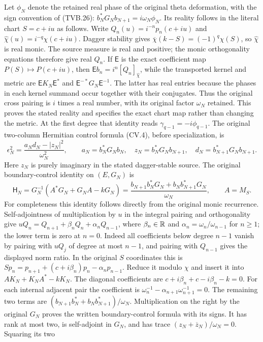 Let $\phi_N$ denote the retained real phase of the original
theta deformation, with the sign convention of (TVB.26):
$b_N^*G_Nb_{N+1}=i\omega_N\phi_N$.
Its reality follows in the literal chart $S=c+iu$ as follows.
Write $Q_n(u)=i^{-n}p_n(c+iu)$ and
$\widehat\chi(u)=i^{-q}\chi(c+iu)$. Dagger stability gives
$\overline\chi(k-S)=(-1)^q\chi(S)$, so $\widehat\chi$
is real monic. The source measure is real and positive; the
monic orthogonality equations therefore give real $Q_n$.
If $\mathsf E$ is the exact coefficient map
$P(S)\mapsto P(c+iu)$, then
$\mathsf E b_n=i^n[Q_n]_{\widehat\chi}$, while the transported
kernel and metric are $\mathsf E K_N\mathsf E^*$ and
$\mathsf E^{-*}G_N\mathsf E^{-1}$.
The latter has real entries because the phases in each kernel
summand occur together with their conjugates. Thus the original
cross pairing is $i$ times a real number, with its original
factor $\omega_N$ retained. This proves the stated reality
and specifies the exact chart map rather than changing the metric.
At the first degree that identity reads
$\gamma_{q-1}=-i\phi_{q-1}$. The original two-column Hermitian
control formula (CV.4), before specialization, is
\[
 \epsilon_N^2=
 \frac{a_N d_N-|z_N|^2}{\omega_N^2},\qquad
 a_N=b_N^*G_Nb_N,\quad z_N=b_N^*G_Nb_{N+1},\quad
 d_N=b_{N+1}^*G_Nb_{N+1}.
 \tag{CJ.5}
\]
Here $z_N$ is purely imaginary in the stated dagger-stable
source. The original boundary-control identity on $(E,G_N)$ is
\[
 \mathsf H_N=G_N^{-1}(A^*G_N+G_NA-kG_N)
 =\frac{b_{N+1}b_N^*G_N+b_Nb_{N+1}^*G_N}{\omega_N},
 \qquad A=M_S.
\]
For completeness this identity follows directly from the original
monic recurrence. Self-adjointness of multiplication by $u$ in
the integral pairing and orthogonality give
$uQ_n=Q_{n+1}+\beta_nQ_n+\alpha_nQ_{n-1}$, where
$\beta_n\in\mathbb{R}$ and $\alpha_n=\omega_n/\omega_{n-1}$ for
$n\ge1$; the lower term is zero at $n=0$.
Indeed all coefficients below degree $n-1$ vanish by pairing
with $uQ_j$ of degree at most $n-1$, and pairing with
$Q_{n-1}$ gives the displayed norm ratio. In the original
$S$ coordinates this is
$Sp_n=p_{n+1}+(c+i\beta_n)p_n-\alpha_np_{n-1}$.
Reduce it modulo $\chi$ and insert it into
$AK_N+K_NA^*-kK_N$. The diagonal coefficients are
$c+i\beta_n+c-i\beta_n-k=0$. For each internal adjacent
pair the coefficient is
$\omega_n^{-1}-\alpha_{n+1}\omega_{n+1}^{-1}=0$.
The remaining two terms are
$(b_{N+1}b_N^*+b_Nb_{N+1}^*)/\omega_N$.
Multiplication on the right by the original $G_N$ proves
the written boundary-control formula with its signs.
It has rank at most two, is self-adjoint in $G_N$, and has
trace $(z_N+\overline z_N)/\omega_N=0$. Squaring its two
